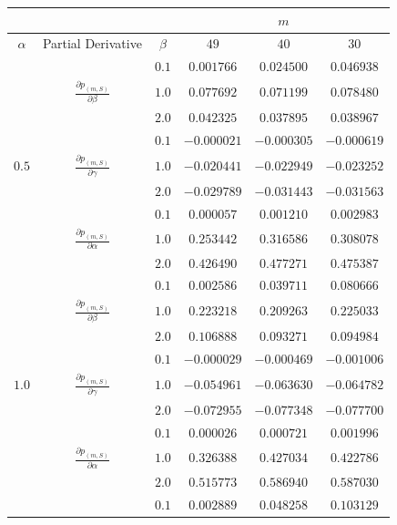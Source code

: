 \documentclass[10pt,A4paper]{article}
\begin{document}
\begin{table}[h]
\centering
\begin{tabular}{|c|c|c|c|c|c|}
\hline
& &  &  & $m$ & \\
\hline
$\alpha$ & Partial Derivative & $\beta$ & $49$ & $40$ & $30$ \\
\hline
 & & $0.1$ & $0.001766$ & $0.024500$ & $0.046938$ \\
\cline{3-6}
 & $\frac{\partial  p_{(m,S)}}{\partial \beta}$ & $1.0$ & $0.077692$ & $0.071199$ & $0.078480$ \\
\cline{3-6}
  & & $2.0$ & $0.042325$ & $0.037895$ & $0.038967$ \\
\cline{2-6}
 & & $0.1$ & $-0.000021$ & $-0.000305$ & $-0.000619$ \\
\cline{3-6}
$0.5$ & $\frac{\partial  p_{(m,S)}}{\partial \gamma}$ & $1.0$ & $-0.020441$ & $-0.022949$ & $-0.023252$ \\
\cline{3-6}
 &  & $2.0$ & $-0.029789$ & $-0.031443$ & $-0.031563$ \\
\cline{2-6}
 & & $0.1$ & $0.000057$ & $0.001210$ & $0.002983$ \\
\cline{3-6}
 & $\frac{\partial  p_{(m,S)}}{\partial \alpha}$ & $1.0$ & $0.253442$ & $0.316586$ & $0.308078$ \\
\cline{3-6}
 & & $2.0$ & $0.426490$ & $0.477271$ & $0.475387$ \\
\hline	
 & & $0.1$ & $0.002586$ & $0.039711$ & $0.080666$ \\
\cline{3-6}		
 & $\frac{\partial  p_{(m,S)}}{\partial \beta}$ & $1.0$ & $0.223218$ & $0.209263$ & $0.225033$ \\
\cline{3-6}		
  & & $2.0$ & $0.106888$ & $0.093271$ & $0.094984$ \\
\cline{2-6}		
 & & $0.1$ & $-0.000029$ & $-0.000469$ & $-0.001006$ \\
\cline{3-6}		
$1.0$ & $\frac{\partial  p_{(m,S)}}{\partial \gamma}$ & $1.0$ & $-0.054961$ & $-0.063630$ & $-0.064782$ \\
\cline{3-6}		
 &  & $2.0$ & $-0.072955$ & $-0.077348$ & $-0.077700$ \\
\cline{2-6}		
 & & $0.1$ & $0.000026$ & $0.000721$ & $0.001996$ \\
\cline{3-6}		
 & $\frac{\partial  p_{(m,S)}}{\partial \alpha}$ & $1.0$ & $0.326388$ & $0.427034$ & $0.422786$ \\
\cline{3-6}		
 & & $2.0$ & $0.515773$ & $0.586940$ & $0.587030$ \\
\hline		
 & & $0.1$ & $0.002889$ & $0.048258$ & $0.103129$ \\

\end{tabular}
\end{table}
\end{document}
